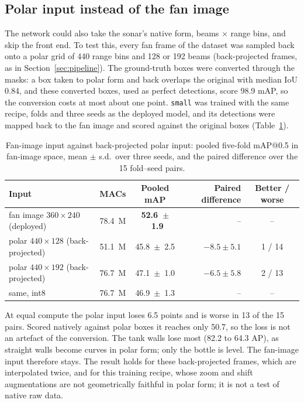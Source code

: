\documentclass[11pt,a4paper]{article}
\newcommand{\cfg}[1]{\texttt{#1}}
\begin{document}
\subsection{Polar input instead of the fan image}
\label{sec:polar}

The network could also take the sonar's native form, beams $\times$ range
bins, and skip the front end. To test this, every fan frame of the dataset
was sampled back onto a polar grid of 440 range bins and 128 or 192 beams
(back-projected frames, as in Section~\ref{sec:pipeline}). The ground-truth
boxes were converted through the masks: a box taken to polar form and back
overlaps the original with median IoU 0.84, and these converted boxes,
used as perfect detections, score 98.9 mAP, so the conversion costs at most
about one point. \cfg{small} was trained with the same recipe, folds and
three seeds as the deployed model, and its detections were mapped back to
the fan image and scored against the original boxes
(Table~\ref{tab:polar}).

\begin{table}[H]
\centering
\caption{Fan-image input against back-projected polar input: pooled
five-fold mAP@0.5 in fan-image space, mean $\pm$ s.d.\ over three seeds,
and the paired difference over the 15 fold--seed pairs.}
\label{tab:polar}
\begin{tabular}{lrcrc}
\toprule
Input & MACs & Pooled mAP & Paired difference & Better / worse \\
\midrule
fan image $360 \times 240$ (deployed) & 78.4~M & \textbf{52.6~$\pm$~1.9} & -- & -- \\
polar $440 \times 128$ (back-projected) & 51.1~M & 45.8~$\pm$~2.5 & $-8.5 \pm 5.1$ & 1 / 14 \\
polar $440 \times 192$ (back-projected) & 76.7~M & 47.1~$\pm$~1.0 & $-6.5 \pm 5.8$ & 2 / 13 \\
\quad same, int8 & 76.7~M & 46.9~$\pm$~1.3 & -- & -- \\
\bottomrule
\end{tabular}
\end{table}

At equal compute the polar input loses 6.5 points and is worse in 13 of
the 15 pairs. Scored natively against polar boxes it reaches only 50.7, so
the loss is not an artefact of the conversion. The tank walls lose most
(82.2 to 64.3 AP), as straight walls become curves in polar form; only the
bottle is level. The fan-image input therefore stays. The result holds for
these back-projected frames, which are interpolated twice, and for this
training recipe, whose zoom and shift augmentations are not geometrically
faithful in polar form; it is not a test of native raw data.
\end{document}
